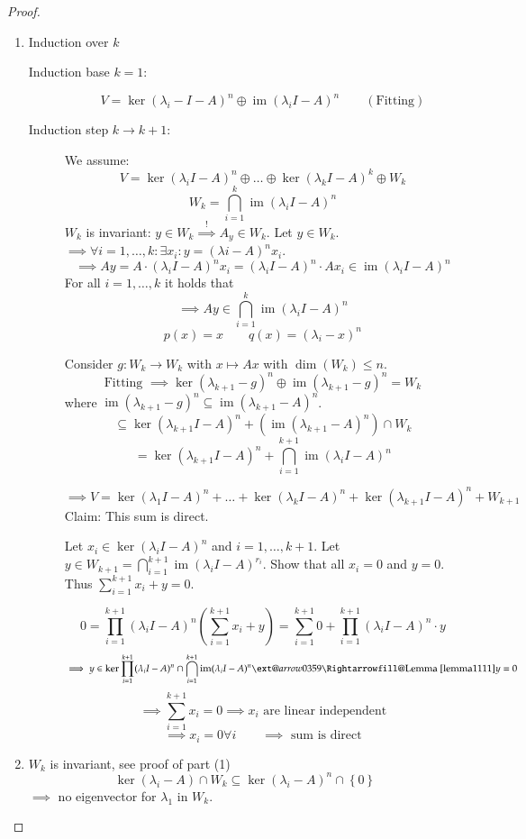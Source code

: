 \documentclass[a4paper]{article}
\makeatletter
\numberwithin{lecref}{section}
\newcommand{\set}[1]{\left\{#1\right\}}
\newcommand{\xRightarrow}[2][]{\ext@arrow 0359\Rightarrowfill@{#1}{#2}}
\DeclareMathOperator{\im}{im}
\makeatother
\begin{document}
\begin{proof}
  \begin{enumerate}
    \item Induction over $k$
      \begin{description}
        \item[Induction base $k=1$:] 
          \[ V = \ker(\lambda_i - I - A)^n \oplus \im(\lambda_i I - A)^n \qquad (\text{Fitting}) \]
        \item[Induction step $k \to k+1$:]
          We assume:
          \[ V = \ker(\lambda_i I - A)^n \oplus \dots \oplus \ker(\lambda_k I - A)^k \oplus W_k \]
          \[ W_k = \bigcap_{i=1}^k \im(\lambda_i I - A)^n \]
          $W_k$ is invariant: $y \in W_k \overset!\implies A_y \in W_k$.
          Let $y \in W_k$. $\implies \forall i = 1, \dots, k: \exists x_i: y = (\lambda i - A)^n x_i$.
          \[ \implies Ay = A \cdot (\lambda_i I - A)^n x_i = (\lambda_i I - A)^n \cdot Ax_i \in \im(\lambda_i I - A)^n \]
          For all $i = 1,\dots,k$ it holds that
          \[ \implies Ay \in \bigcap_{i=1}^k \im(\lambda_i I - A)^n \]
          \[ p(x) = x \qquad q(x) = (\lambda_i - x)^n \]

          Consider $g: W_k \to W_k$ with $x \mapsto Ax$ with $\dim(W_k) \leq n$.
          \[ \text{Fitting } \implies \ker(\lambda_{k+1} - g)^n \oplus \im(\lambda_{k+1} - g)^n = W_k \]
          where $\im(\lambda_{k+1} - g)^n \subseteq \im(\lambda_{k+1} - A)^n$.
          \[ \subseteq \ker(\lambda_{k+1} I - A)^n + (\im(\lambda_{k+1} - A)^n) \cap W_k \]
          \[ = \ker(\lambda_{k+1} I - A)^n + \bigcap_{i=1}^{k+1} \im(\lambda_i I - A)^n \]

          \[ \implies V = \ker(\lambda_1 I - A)^n + \dots + \ker(\lambda_k I - A)^n + \ker(\lambda_{k+1} I - A)^n + W_{k+1} \]
          Claim: This sum is direct.

          Let $x_i \in \ker(\lambda_i I - A)^n$ and $i=1,\dots,k+1$.
          Let $y \in W_{k+1} = \bigcap_{i=1}^{k+1} \im(\lambda_i I - A)^{r_i}$.
          Show that all $x_i = 0$ and $y = 0$. Thus $\sum_{i=1}^{k+1} x_i + y = 0$.

          \[ 0 = \prod_{i=1}^{k+1} (\lambda_i I - A)^n \left(\sum_{i=1}^{k+1} x_i + y\right) = \sum_{i=1}^{k+1} 0 + \prod_{i=1}^{k+1} (\lambda_i I - A)^n \cdot y \]
          \[ \implies y \in \ker{\prod_{i=1}^{k+1} (\lambda_i I - A)^n \cap \bigcap_{i=1}^{k+1} \im(\lambda_i I - A)^n} \xRightarrow{\text{Lemma~\ref{lemma1111}}} y = 0 \]
          \[ \implies \sum_{i=1}^{k+1} x_i = 0 \implies x_i \text{ are linear independent} \]
          \[ \implies x_i = 0 \forall i \qquad \implies \text{ sum is direct} \]
      \end{description}
    \item
      $W_k$ is invariant, see proof of part (1)
      \[ \ker(\lambda_i - A) \cap W_k \subseteq \ker(\lambda_i - A)^n \cap \set{0} \]
      $\implies$ no eigenvector for $\lambda_1$ in $W_k$.
  \end{enumerate}
\end{proof}
\end{document}
